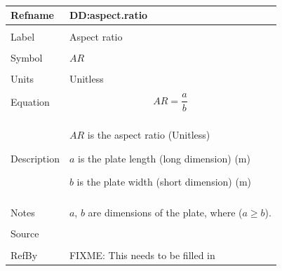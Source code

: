 \documentclass[12pt]{article}
\begin{document}
~\newline
\noindent \begin{minipage}{\textwidth}
\begin{tabular}{p{} p{}}
\toprule \textbf{Refname} & \textbf{DD:aspect.ratio}
\label{DD:aspect.ratio}
\\ \midrule \\
Label & Aspect ratio
\\ \midrule \\
Symbol & $AR$
\\ \midrule \\
Units & Unitless
\\ \midrule \\
Equation & \begin{dmath}
           AR=\frac{a}{b}
           \end{dmath}
\\ \midrule \\
Description & \begin{symbDescription}
              \item{$AR$ is the aspect ratio (Unitless)}
              \item{$a$ is the plate length (long dimension) (m)}
              \item{$b$ is the plate width (short dimension) (m)}
              \end{symbDescription}
\\ \midrule \\
Notes & $a$, $b$ are dimensions of the plate, where ($a\geq{}b$).
\\ \midrule \\
Source & \cite{astm2009}
\\ \midrule \\
RefBy & FIXME: This needs to be filled in
\\ \bottomrule \end{tabular}
\end{minipage}\\
~\newline
\end{document}
